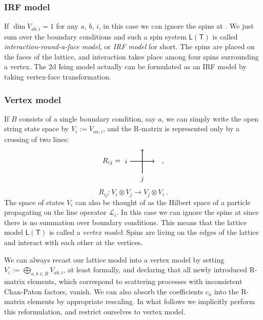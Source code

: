 \subsubsection*{IRF model}

If $\dim V_{ab,i}=1$ for any $a,\,b,\,i$, in this case we can ignore
the spins at . We just sum over the boundary conditions
and such a spin system $\mathsf{L}(\mathsf{T})$ is called
\emph{interaction-round-a-face model}, or \emph{IRF model} for short.
The spins are placed on the faces of the lattice, and interaction
takes place among four spins surrounding a vertex. The 2d Ising model
actually can be formulated as an IRF model by taking vertex-face transformation.


\subsubsection*{Vertex model}

If $B$ consists of a single boundary condition, say $a$, we can
simply write the open string state space by $V_{i}:=V_{aa,i}$, and
the R-matrix is represented only by a crossing of two lines:
\begin{equation}
  R_{ij}
  =
    \begin{tikzpicture}[scale=0.6, baseline=(x.base)]
        \node (x) at (0,0) {\vphantom{x}};

        \draw[thick, ->] (0,0) node[left] {$i$} -- (2,0);
        \draw[thick, ->] (1,-1) node[below] {$j$} -- (1,1);

    \end{tikzpicture}
  \quad ,
\end{equation}
\begin{equation}
  R_{ij}  :  V_{i}\otimes V_{j}  \longrightarrow  V_{j}\otimes V_{i}
  ~ .
\end{equation}
The space of states $V_{i}$ can also be thought of as the Hilbert
space of a particle propagating on the line operator $\mathcal{L}_{i}$.
In this case we can ignore the spins at  since there
is no summation over boundary conditions. This means that the lattice
model $\mathsf{L}\left(\mathsf{T}\right)$ is called a \emph{vertex
model}: Spins are living on the edges of the lattice and interact
with each other at the vertices.

We can always recast our lattice model into a vertex model by setting
$V_{i}:=\bigoplus_{a,b\in B}V_{ab,i}$, at least formally, and declaring
that all newly introduced R-matrix elements, which correspond to scattering
processes with inconsistent Chan-Paton factors, vanish. We can also
absorb the coefficients $c_{a}$ into the R-matrix elements by appropriate
rescaling. In what follows we implicitly perform this reformulation,
and restrict ourselves to vertex model.

